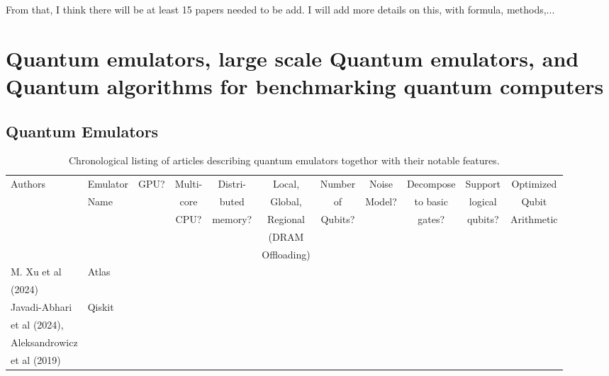 \documentclass[a4paper,fleqn]{cas-sc}
\begin{document}
From that, I think there will be at least 15 papers needed to be add.
I will add more details on this, with formula, methods,...


\section{Quantum emulators, large scale Quantum emulators, and 
  Quantum algorithms
  for benchmarking quantum computers}

\subsection{Quantum Emulators}


\begin{table}[H]
\footnotesize
\center
\begin{tabular}{ | l | l | c | c | c | c | c | c | c | c | c |}
\hline
\hline
Authors            & Emulator & GPU? & Multi- & Distri- & Local,     &Number  &Noise  & Decompose & Support & Optimized \\ 
		   & Name     &      & core   & buted   & Global,    &of      &Model? & to basic  & logical & Qubit     \\ 
		   &          &      & CPU?   & memory? & Regional   &Qubits? &       & gates?    & qubits? & Arithmetic\\
                   &          &      &        &         & (DRAM      &        &       &           &         &       \\  
                   &          &      &        &         & Offloading)&        &       &           &         &       \\  \hline
M. Xu et al        & Atlas    &      &        &         &            &        &       &           &         &       \\ 
\cite{xu2024atlas} (2024) & & & & & & & & & \\ \hline
Javadi-Abhari      & Qiskit   &      &        &         &            &        &       &           &         & 	\\ 
et al\cite{javadi2024quantum} (2024),       & & & & & & & & & &\\
Aleksandrowicz                              & & & & & & & & & &\\
et al\cite{aleksandrowicz2019qiskit} (2019) & & & & & & & & & &\\ \hline
\end{tabular}
\caption{Chronological listing of articles describing quantum emulators
togethor with their notable features. }
\label{tab:tablesummary}
\end{table}
\end{document}
